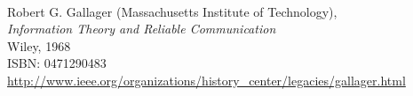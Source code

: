 \begin{thebibliography}{9}
 \hspace{1pt}\\
  Robert G. Gallager (Massachusetts Institute of Technology), \\
  {\em Information Theory and Reliable Communication} \\
  Wiley, 1968 \\
  ISBN: 0471290483 \\
  \url{http://www.ieee.org/organizations/history\_center/legacies/gallager.html}


   
\end{thebibliography}




